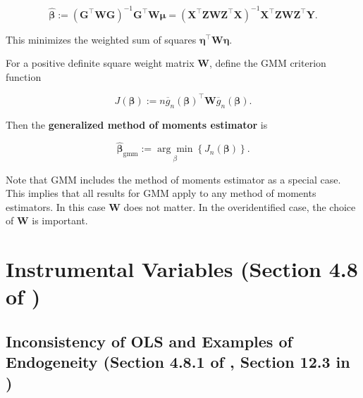 \begin{equation}\label{economet.gmm.iv.o}
\hat{\boldsymbol{\beta}}  := \left( \boldsymbol{G}^\top \boldsymbol{W}  \boldsymbol{G} \right)^{-1}  \boldsymbol{G}^\top \boldsymbol{W} \boldsymbol{\mu} = \left(\boldsymbol{X} ^\top \boldsymbol{Z} \boldsymbol{W}  \boldsymbol{Z}^\top \boldsymbol{X}\right)^{-1}  \boldsymbol{X} ^\top \boldsymbol{Z} \boldsymbol{W} \boldsymbol{Z}^\top \boldsymbol{Y} .
\end{equation}

This minimizes the weighted sum of squares \(\boldsymbol{\eta}^\top \boldsymbol{W} \boldsymbol{\eta}\).

\begin{definition}

For a positive definite square weight matrix \(\boldsymbol{W}\), define the GMM criterion function

\begin{equation}\label{economet.def.gmm.crit}
J(\boldsymbol{\beta}) := n \overline{g}_n(\boldsymbol{\beta})^\top \boldsymbol{W} \overline{g}_n (\boldsymbol{\beta}).
\end{equation}

Then the \textbf{generalized method of moments estimator} is 

\[
\hat{\boldsymbol{\beta}}_{\text{gmm}} := \underset{\beta}{\arg \min} \left\{J_n(\boldsymbol{\beta})\right\}.
\]

\end{definition}

Note that GMM includes the method of moments estimator as a special case. This implies that all results for GMM apply to any method of moments estimators. In this case \(\boldsymbol{W}\) does not matter. In the overidentified case, the choice of \(\boldsymbol{W}\) is important.


\section{Instrumental Variables (Section 4.8 of \citet{cameron_trivedi_2005})}



\subsection{Inconsistency of OLS and Examples of Endogeneity (Section 4.8.1 of \citet{cameron_trivedi_2005}, Section 12.3 in \citet{hansen2020})}

